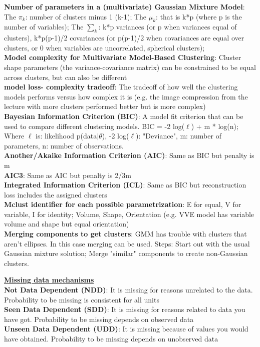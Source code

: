 \documentclass[a4paper,7pt,landscape]{extarticle}
\begin{document}
\begin{multicols}{3}
\begin{boxA}
\textbf{Number of parameters in a (multivariate) Gaussian Mixture Model}: The $\pi_k$: number of clusters minus 1 (k-1); The $\mu_k$: that is k*p (where p is the number of variables); The $\sum_k$:  k*p variances (or p when variances equal of clusters), k*p(p-1)/2 covariances (or p(p-1)/2 when covariances are equal over clusters, or 0 when variables are uncorrelated, spherical clusters);\\
\textbf{Model complexity for Multivariate Model-Based Clustering}: Cluster shape parameters (the variance-covariance matrix) can be constrained to be equal across clusters, but can also be different\\
\textbf{model loss- complexity tradeoff}: The tradeoff of how well the clustering models performs versus how complex it is (e.g. the image compression from the lecture with more clusters performed better but is more complex)\\
\textbf{Bayesian Information Criterion (BIC)}: A model fit criterion that can be used to compare different clustering models. BIC = -2 log($\ell$) + m * log(n); Where $\ell$ is: likelihood p(data$|\theta$), -2 log($\ell$): "Deviance", m: number of parameters, n: number of observations.\\
\textbf{Another/Akaike Information Criterion (AIC)}: Same as BIC but penalty is m\\
\textbf{AIC3}: Same as AIC but penalty is 2/3m\\
\textbf{Integrated Information Criterion (ICL)}: Same as BIC but reconstruction loss includes the assigned clusters\\
\textbf{Mclust identifier for each possible parametrization}: E for equal, V for variable, I for identity; Volume, Shape, Orientation (e.g. VVE model has  variable volume and shape but equal orientation)\\
\textbf{Merging components to get clusters}: GMM has trouble with clusters that aren't ellipses. In this case merging can be used. Steps: Start out with the usual Gaussian mixture solution; Merge "similar" components to create non-Gaussian clusters.
\end{boxA}

\begin{boxA}
\underline{\textbf{Missing data mechanisms}}\\
\textbf{Not Data Dependent (NDD)}: It is missing for reasons unrelated to the data. Probability to be missing is consistent for all units\\
\textbf{Seen Data Dependent (SDD)}: It is missing for reasons related to data you have got. Probability to be missing depends on observed data\\
\textbf{Unseen Data Dependent (UDD)}: It is missing because of values you would have obtained. Probability to be missing depends on unobserved data\\
\end{boxA}


\end{multicols}
\end{document}
